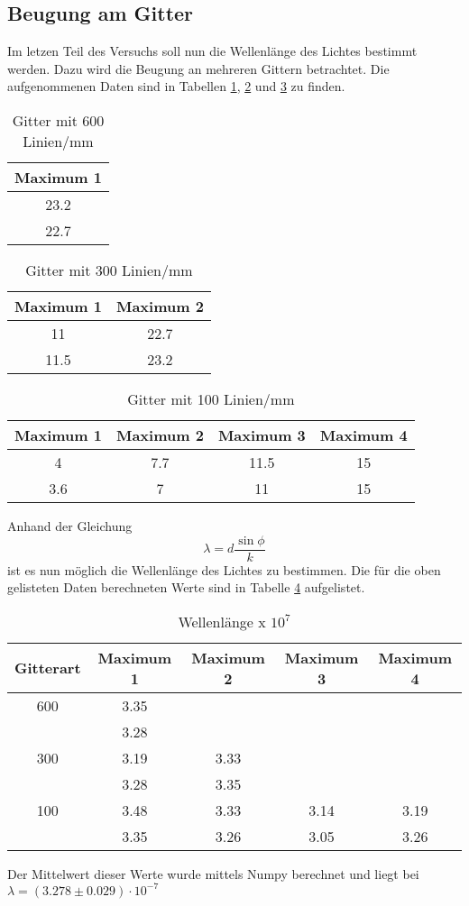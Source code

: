 \subsection{Beugung am Gitter}
  Im letzen Teil des Versuchs soll nun die Wellenlänge des Lichtes bestimmt werden. Dazu 
  wird die Beugung an mehreren Gittern betrachtet. Die aufgenommenen Daten sind in Tabellen \ref{tab:gitter1},
  \ref{tab:gitter2} und \ref{tab:gitter3} zu finden.
  \begin{table}[H]
    \centering
    \caption{Gitter mit 600 Linien/mm}
    \begin{tabular}{c}
      \toprule
      Maximum 1\\
      \midrule
      23.2 \\
      22.7 \\
      \bottomrule
    \end{tabular}
    \label{tab:gitter1}
  \end{table}
  \begin{table}[H]
    \centering
    \caption{Gitter mit 300 Linien/mm}
    \begin{tabular}{c c}
      \toprule
      Maximum 1 & Maximum 2\\
      \midrule
      11   & 22.7 \\
      11.5 & 23.2 \\
      \bottomrule
    \end{tabular}
    \label{tab:gitter2}
  \end{table}
  \begin{table}[H]
    \centering
    \caption{Gitter mit 100 Linien/mm}
    \begin{tabular}{c c c c}
      \toprule
      Maximum 1 & Maximum 2 & Maximum 3 & Maximum 4\\
      \midrule
      4   & 7.7 & 11.5 & 15 \\
      3.6 & 7   & 11   & 15 \\
      \bottomrule
    \end{tabular}
    \label{tab:gitter3}
  \end{table}
  \noindent Anhand der Gleichung 
  \begin{equation*}
    \lambda = d \dfrac{\sin{\phi}}{k}
  \end{equation*}
  ist es nun möglich die Wellenlänge des Lichtes zu bestimmen. Die für die oben 
  gelisteten Daten berechneten Werte sind in Tabelle \ref{tab:wellen} aufgelistet.
  \begin{table}[H]
    \centering
    \caption{Wellenlänge x $ 10^{7}$}
    \begin{tabular}{c c c c c}
      \toprule
      Gitterart & Maximum 1 & Maximum 2 & Maximum 3 & Maximum 4\\
      \midrule
      600&3.35   &&&\\
      &3.28&&&\\
      300&3.19& 3.33&& \\
      &3.28&3.35&&\\
      100&  3.48   &   3.33&  3.14&3.19 \\
      &3.35&3.26&3.05&3.26\\
      \bottomrule
    \end{tabular}
    \label{tab:wellen}
  \end{table}
  \noindent Der Mittelwert dieser Werte wurde mittels Numpy berechnet und liegt bei 
  $\lambda=(3.278\pm0.029)\cdot 10^{-7}$